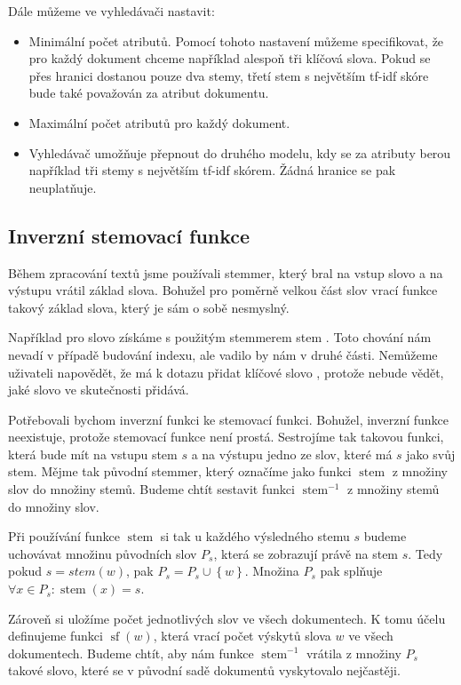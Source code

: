\documentclass[12pt]{article}
\newcommand{\ssection}[1]{\subsection{#1}}
\newcommand{\adds}[1]{\left\{#1\right\}}
\DeclareMathOperator{\stem}{stem}
\DeclareMathOperator{\wcount}{sf}
\newcommand{\invstem}{\stem^{-1}}
\begin{document}
Dále můžeme ve vyhledávači nastavit:

\begin{itemize}
	\item Minimální počet atributů. Pomocí tohoto nastavení můžeme specifikovat, že pro každý dokument chceme například alespoň tři klíčová slova. Pokud se přes hranici dostanou pouze dva stemy, třetí stem s největším tf-idf skóre bude také považován za atribut dokumentu. 
	\item Maximální počet atributů pro každý dokument. 
	\item Vyhledávač umožňuje přepnout do druhého modelu, kdy se za atributy berou například tři stemy s největším tf-idf skórem. Žádná hranice se pak neuplatňuje. 
\end{itemize}

\ssection{Inverzní stemovací funkce}

Během zpracování textů jsme používali stemmer, který bral na vstup slovo a na výstupu vrátil základ slova. Bohužel pro poměrně velkou část slov vrací funkce takový základ slova, který je sám o sobě nesmyslný. 

Například pro slovo  získáme s použitým stemmerem stem . Toto chování nám nevadí v případě budování indexu, ale vadilo by nám v druhé části. Nemůžeme uživateli napovědět, že má k dotazu přidat klíčové slovo , protože nebude vědět, jaké slovo ve skutečnosti přidává. 

Potřebovali bychom inverzní funkci ke stemovací funkci. Bohužel, inverzní funkce neexistuje, protože stemovací funkce není prostá. Sestrojíme tak takovou funkci, která bude mít na vstupu stem $s$ a na výstupu jedno ze slov, které má $s$ jako svůj stem. Mějme tak původní stemmer, který označíme jako funkci $\stem$ z množiny slov do množiny stemů. Budeme chtít sestavit funkci $\invstem$ z množiny stemů do množiny slov.

Při používání funkce $\stem$ si tak u každého výsledného stemu $s$ budeme uchovávat množinu původních slov $P_s$, která se zobrazují právě na stem $s$. Tedy pokud $s=stem(w)$, pak $P_s=P_s\cup\adds{w}$. Množina $P_s$ pak splňuje $\forall x\in P_s: \stem(x)=s$. 

Zároveň si uložíme počet jednotlivých slov ve všech dokumentech. K tomu účelu definujeme funkci $\wcount(w)$, která vrací počet výskytů slova $w$ ve všech dokumentech. Budeme chtít, aby nám funkce $\invstem$ vrátila z množiny $P_s$ takové slovo, které se v původní sadě dokumentů vyskytovalo nejčastěji. 
\end{document}
